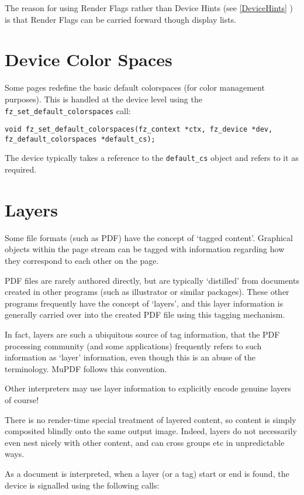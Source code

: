 \documentclass[oneside]{book}
\newcommand{\rjwref}[1] {\autoref{#1} \nameref{#1}}
\begin{document}
The reason for using Render Flags rather than Device Hints (see \rjwref{DeviceHints}) is that Render Flags can be carried forward though display lists.

\section{Device Color Spaces}

Some pages redefine the basic default colorspaces (for color management purposes). This is handled at the device level using the \texttt{fz\_set\_default\_colorspaces} call:

\begin{lstlisting}
void fz_set_default_colorspaces(fz_context *ctx, fz_device *dev, fz_default_colorspaces *default_cs);
\end{lstlisting}

The device typically takes a reference to the \texttt{default\_cs} object and refers to it as required.

\section{Layers}

Some file formats (such as PDF) have the concept of `tagged content'. Graphical objects within the page stream can be tagged with information regarding how they correspond to each other on the page.

PDF files are rarely authored directly, but are typically `distilled' from documents created in other programs (such as illustrator or similar packages). These other programs frequently have the concept of `layers', and this layer information is generally carried over into the created PDF file using this tagging mechanism.

In fact, layers are such a ubiquitous source of tag information, that the PDF processing community (and some applications) frequently refers to such information as `layer' information, even though this is an abuse of the terminology. MuPDF follows this convention.

Other interpreters may use layer information to explicitly encode genuine layers of course!

There is no render-time special treatment of layered content, so content is simply composited blindly onto the same output image. Indeed, layers do not necessarily even nest nicely with other content, and can cross groups etc in unpredictable ways.

As a document is interpreted, when a layer (or a tag) start or end is found, the device is signalled using the following calls:
\end{document}
